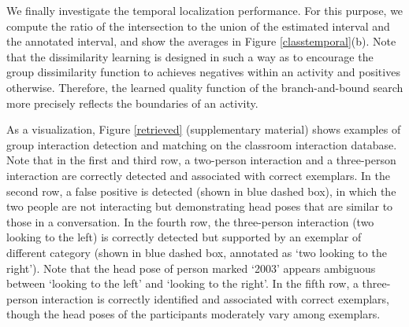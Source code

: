 We finally investigate the temporal localization performance. For this purpose, we compute the ratio of the intersection to the union of the estimated interval and the annotated interval, and show the averages in Figure \ref{classtemporal}(b).  Note that the dissimilarity learning is designed in such a way as to encourage the group dissimilarity function to achieves negatives within an activity and positives otherwise. Therefore, the learned quality function of the branch-and-bound search more precisely reflects the boundaries of an activity.

As a visualization, Figure \ref{retrieved} (supplementary material) shows examples of group interaction detection and matching on the classroom interaction database. Note that in the first and third row, a two-person interaction and a three-person interaction are correctly detected and associated with correct exemplars. In the second row, a false positive is detected (shown in blue dashed box), in which the two people are not interacting but demonstrating head poses that are similar to those in a conversation. In the fourth row, the three-person interaction (two looking to the left) is correctly detected but supported by an exemplar of different category (shown in blue dashed box, annotated as `two looking to the right'). Note that the head pose of person marked `2003' appears ambiguous between `looking to the left' and `looking to the right'. In the fifth row, a three-person interaction is correctly identified and associated with correct exemplars, though the head poses of the participants moderately vary among exemplars. 

\vspace{0.05in}
